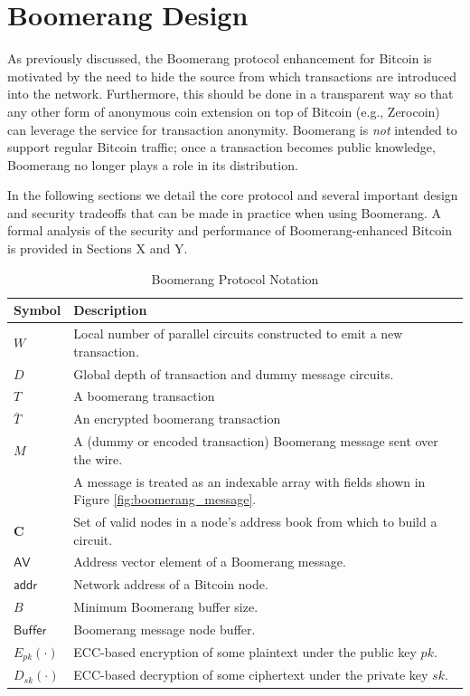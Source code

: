 \section{Boomerang Design} \label{sec:design}

As previously discussed, the Boomerang protocol enhancement for Bitcoin is motivated by the need to hide the source from which transactions are introduced into the network. Furthermore, this should be done in a transparent way so that any other form of anonymous coin extension on top of Bitcoin (e.g., Zerocoin) can leverage the service for transaction anonymity. Boomerang is \emph{not} intended to support regular Bitcoin traffic; once a transaction becomes public knowledge, Boomerang no longer plays a role in its distribution. 

In the following sections we detail the core protocol and several important design and security tradeoffs that can be made in practice when using Boomerang. A formal analysis of the security and performance of Boomerang-enhanced Bitcoin is provided in Sections X and Y. 

\begin{table}[ht!]
\begin{center}
\caption{Boomerang Protocol Notation}
\label{tab:notation}
	\begin{tabular}{|l|l|}\hline
	\textbf{Symbol} & \textbf{Description} \\ \hline
	$W$ & Local number of parallel circuits constructed to emit a new transaction. \\
	$D$ & Global depth of transaction and dummy message circuits. \\
	$T$ & A boomerang transaction \\ 
	$\bar{T}$ & An encrypted boomerang transaction \\ 
	$M$ & A (dummy or encoded transaction) Boomerang message sent over the wire. \\
	~ & A message is treated as an indexable array with fields shown in Figure \ref{fig:boomerang_message}. \\
	$\mathbf{C}$ & Set of valid nodes in a node's address book from which to build a circuit. \\
	$\mathsf{AV}$ & Address vector element of a Boomerang message. \\
	$\mathsf{addr}$ & Network address of a Bitcoin node. \\
	$B$ & Minimum Boomerang buffer size. \\
	$\mathsf{Buffer}$ & Boomerang message node buffer. \\
	$E_{pk}(\cdot)$ & ECC-based encryption of some plaintext under the public key $pk$. \\	
	$D_{sk}(\cdot)$ & ECC-based decryption of some ciphertext under the private key $sk$. \\ \hline
	\end{tabular}
\end{center}
\end{table}

